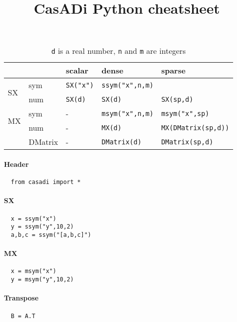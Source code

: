 \documentclass[a4paper,8pt,twocolumn]{article}
\begin{document}
\title{CasADi Python cheatsheet}
\date{}
\maketitle

\begin{center}
\begin{table}
\begin{tabular}{ll|lll}
 & & scalar & dense & sparse \\
\hline
\multirow{2}{*}{SX} & sym & \verb|SX("x")| & \verb|ssym("x",n,m)|  &  \\ 
    & num & \verb|SX(d)|  & \verb|SX(d)|  & \verb|SX(sp,d)| \\
\hline
\multirow{2}{*}{MX} & sym & - & \verb|msym("x",n,m)|  & \verb|msym("x",sp)|\\
    & num & - & \verb|MX(d)| &  \verb|MX(DMatrix(sp,d))| \\
\hline
    & DMatrix & -  & \verb|DMatrix(d)|  & \verb|DMatrix(sp,d)| \\
\end{tabular}
\caption{\texttt{d} is a real number, \texttt{n} and \texttt{m} are integers }
\label{tab:constr}
\end{table}
\end{center}



\paragraph{Header}
\begin{verbatim}
  from casadi import *
\end{verbatim}

\paragraph{SX}
\begin{verbatim}
  x = ssym("x")
  y = ssym("y",10,2)
  a,b,c = ssym("[a,b,c]")
\end{verbatim}

\paragraph{MX}
\begin{verbatim}
  x = msym("x")
  y = msym("y",10,2)
\end{verbatim}

\paragraph{Transpose}
\begin{verbatim}
  B = A.T
\end{verbatim}
\end{document}
